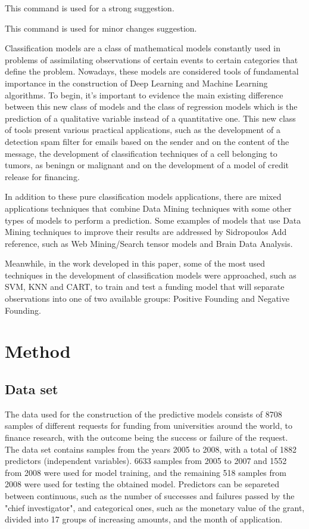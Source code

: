 \documentclass[conference]{IEEEtran}
\newcommand{\reviewNormal}[1]{{\color{yellow} #1}} %
\newcommand{\reviewMinor}[1]{{\color{green} #1}} %
\begin{document}
\reviewNormal{This command is used for a strong suggestion.}

\reviewMinor{This command is used for minor changes suggestion.}

Classification models are a class of mathematical models constantly used in problems of
assimilating observations of certain events to certain categories that define the problem.
Nowadays, these models are considered tools of fundamental importance in the construction 
of Deep Learning and Machine Learning algorithms. To begin, it's important to evidence 
the main existing difference between this new class of models and the class of 
regression models which is the prediction of a qualitative variable instead of a quantitative
one. This new class of tools present various practical applications, such as the 
development of a detection spam filter for emails based on the sender and on the content
of the message, the development of classification techniques of a cell belonging to tumors, 
as beningn or malignant and on the development of a model of credit release for financing.

In addition to these pure classification models applications, there are mixed applications 
techniques that combine Data Mining techniques with some other types of models to perform
a prediction. Some examples of models that use Data Mining techniques to improve their 
results are addressed by Sidropoulos \reviewNormal{Add reference}, such as Web Mining/Search 
tensor models and Brain Data Analysis. 

Meanwhile, in the work developed in this paper, some of the most used techniques in the
development of classification models were approached, such as SVM, KNN and CART, to train and 
test a funding model that will separate observations into one of two available groups:
Positive Founding and Negative Founding.


\section{Method}

\subsection{Data set}

The data used for the construction of the predictive models consists of 8708 samples
of different requests for funding from universities around the world, to finance research,
with the outcome being the success or failure of the request. The data set contains samples
from the years 2005 to 2008, with a total of 1882 predictors (independent variables). 
6633 samples from 2005 to 2007 and 1552 from 2008 were used for model training, and the 
remaining 518 samples from 2008 were used for testing the obtained model. Predictors can be 
separeted between continuous, such as the number of successes and failures passed by the 
"chief investigator", and categorical ones, such as the monetary value of the grant, 
divided into 17 groups of increasing amounts, and the month of application.
\end{document}
